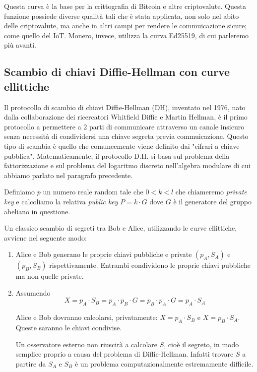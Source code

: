 \documentclass[12pt,a4paper]{article}
\begin{document}
Questa curva è la base per la crittografia di Bitcoin e altre criptovalute.
Questa funzione possiede diverse qualità tali che è stata applicata, non solo
nel abito delle criptovalute, ma anche in altri campi per rendere le
commuicazione sicure; come quello del IoT. Monero, invece, utilizza la curva
Ed25519, di cui parleremo più avanti.

\subsection{Scambio di chiavi Diffie-Hellman con curve ellittiche}
Il protocollo di scambio di chiavi Diffie-Hellman (DH), inventato nel 1976, nato
dalla collaborazione dei ricercatori Whitfield Diffie e Martin Hellman, è il
primo protocollo a permettere a 2 parti di communicare attraverso un canale
insicuro senza necessità di condividersi una chiave segreta previa
commuicazione. Questo tipo di scambia è quello che comuneemente viene definito dai "cifrari a chiave pubblica".
Matematicamente, il protocollo D.H. si basa sul problema della fattorizzazione e
sul problema del logaritmo discreto nell'algebra modulare di cui abbiamo parlato nel paragrafo precedente.

Definiamo $ p $ un numero reale random tale che $0 < k < l$ che chiameremo
\textit{private key} e calcoliamo la relativa \textit{public key} $ P = k \cdot
G $ dove $ G $ è il generatore del gruppo abeliano in questione.

Un classico scambio di segreti tra Bob e Alice, utilizzando le curve ellittiche,
avviene nel seguente modo:

\begin{enumerate}
    \item Alice e Bob generano le proprie chiavi pubbliche e private $ (p_A,
    S_A) $ e $ (p_B, S_B) $ rispettivamente. Entrambi condividono le proprie
    chiavi pubbliche ma non quelle private.
    \item Assumendo
        $$ X = p_A \cdot S_B = p_A \cdot p_B \cdot G = p_B \cdot p_A \cdot G =
        p_A \cdot S_A $$

        Alice e Bob dovranno calcolarsi, privatamente: $ X = p_A \cdot S_B $ e $
        X = p_B \cdot S_A $. Queste saranno le chiavi condivise.

        Un osservatore esterno non riuscirà a calcolare $ S $, cioè il segreto,
        in modo semplice proprio a causa del problema di Diffie-Hellman. Infatti
        trovare $ S $ a partire da $ S_A $ e $ S_B $ è un problema
        computazionalmente estremamente difficile.
\end{enumerate}
\end{document}
